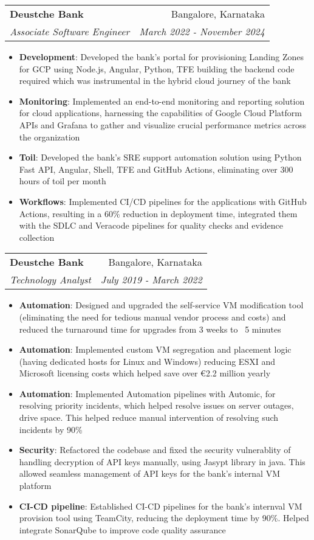 \documentclass[letterpaper,11pt]{article}
\makeatletter
\newcommand{\resumeItem}[2]{
  \item\small{
    \textbf{#1}{: #2 \vspace{-2pt}}
  }
}
\newcommand{\resumeSubheading}[4]{
  \vspace{-1pt}\item
    \begin{tabular*}{0.97\textwidth}[t]{l@{\extracolsep{\fill}}r}
      \textbf{#1} & #2 \\
      \textit{\small#3} & \textit{\small #4} \\
    \end{tabular*}\vspace{-5pt}
}
\newcommand{\resumeItemListStart}{\begin{itemize}}
\newcommand{\resumeItemListEnd}{\end{itemize}\vspace{-5pt}}
\makeatother
\begin{document}
    \resumeSubheading
      {Deustche Bank}{Bangalore, Karnataka}
      {Associate Software Engineer}{March 2022 - November 2024}
      \resumeItemListStart
        \resumeItem{Development}
          {Developed the bank's portal for provisioning Landing Zones for GCP using Node.js, Angular, Python, TFE building the backend code required which was instrumental in the hybrid cloud journey of the bank}
        \resumeItem{Monitoring}
          {Implemented an end-to-end monitoring and reporting solution for cloud applications, harnessing the capabilities of Google Cloud Platform APIs and Grafana to gather and visualize crucial performance metrics across the organization}     
        \resumeItem{Toil}
          {Developed the bank's SRE support automation solution using Python Fast API, Angular, Shell, TFE and GitHub Actions, eliminating over 300 hours of toil per month}
        \resumeItem{Workflows}
          {Implemented CI/CD pipelines for the applications with GitHub Actions, resulting in a 60\% reduction in deployment time, integrated them with the SDLC and Veracode pipelines for quality checks and evidence collection}
      \resumeItemListEnd
       

    \resumeSubheading
      {Deustche Bank}{Bangalore, Karnataka}
      {Technology Analyst}{July 2019 - March 2022}
      \resumeItemListStart
        \resumeItem{Automation}
          {Designed and upgraded the self-service VM modification tool (eliminating the need for tedious manual vendor process and costs) and reduced the turnaround time for upgrades from 3 weeks to ~5 minutes} 
        \resumeItem{Automation}
          {Implemented custom VM segregation and placement logic (having dedicated hosts for Linux and Windows) reducing ESXI and Microsoft licensing costs which helped save over €2.2 million yearly} 
        \resumeItem{Automation}
          {Implemented Automation pipelines with Automic, for resolving priority incidents, which helped resolve issues on server outages, drive space. This helped reduce manual intervention of resolving such incidents by 90\%} 
        \resumeItem{Security}
          {Refactored the codebase and fixed the security vulnerablity of handling decryption of API keys manually, using Jasypt library in java. This allowed seamless management of API keys for the bank's internal VM platform}
        \resumeItem{CI-CD pipeline}
          {Established CI-CD pipelines for the bank's internval VM provision tool using TeamCity, reducing the deployment time by 90\%. Helped integrate SonarQube to improve code quality assurance }
      \resumeItemListEnd
\end{document}
